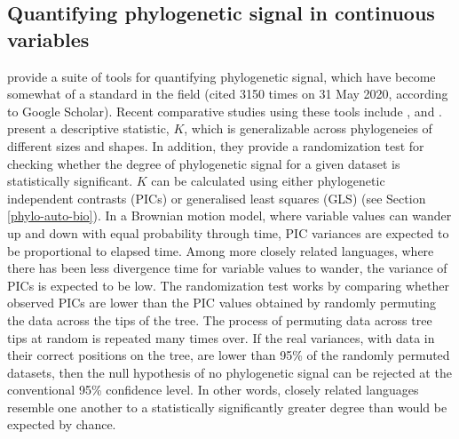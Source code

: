 \hypertarget{phylo-sig-quant}{%
\subsection{Quantifying phylogenetic signal in continuous variables}\label{phylo-sig-quant}}

\textcite{blomberg_testing_2003} provide a suite of tools for quantifying phylogenetic signal, which have become somewhat of a standard in the field (cited 3150 times on 31 May 2020, according to Google Scholar). Recent comparative studies using these tools include \textcite{balisi_dietary_2018}, \textcite{hutchinson_contemporary_2018} and \textcite{leff_predicting_2018}. \textcite{blomberg_testing_2003} present a descriptive statistic, \(K\), which is generalizable across phylogeneies of different sizes and shapes. In addition, they provide a randomization test for checking whether the degree of phylogenetic signal for a given dataset is statistically significant. \(K\) can be calculated using either phylogenetic independent contrasts (PICs) \autocite{felsenstein_phylogenies_1985} or generalised least squares (GLS) \autocite{grafen_phylogenetic_1989} (see Section \ref{phylo-auto-bio}). In a Brownian motion model, where variable values can wander up and down with equal probability through time, PIC variances are expected to be proportional to elapsed time. Among more closely related languages, where there has been less divergence time for variable values to wander, the variance of PICs is expected to be low. The randomization test works by comparing whether observed PICs are lower than the PIC values obtained by randomly permuting the data across the tips of the tree. The process of permuting data across tree tips at random is repeated many times over. If the real variances, with data in their correct positions on the tree, are lower than 95\% of the randomly permuted datasets, then the null hypothesis of no phylogenetic signal can be rejected at the conventional 95\% confidence level. In other words, closely related languages resemble one another to a statistically significantly greater degree than would be expected by chance.

